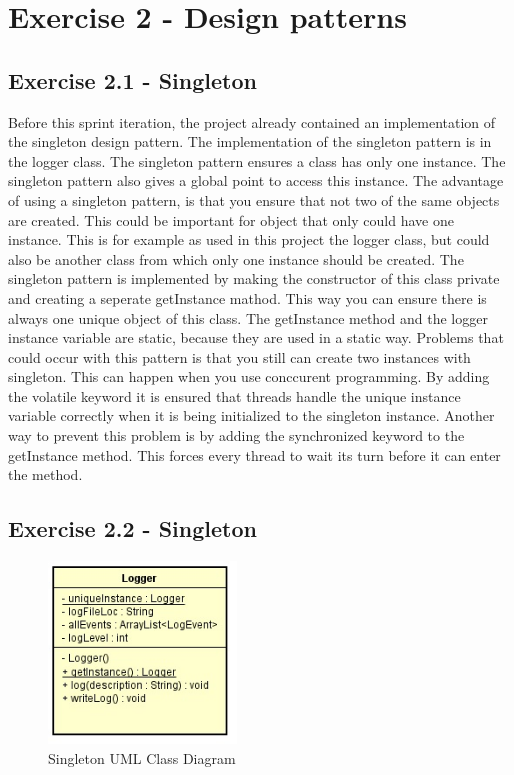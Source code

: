 \section{Exercise 2 - Design patterns }
\subsection{Exercise 2.1 - Singleton}
Before this sprint iteration, the project already contained an implementation of the singleton design pattern. The implementation of the singleton pattern is in the logger class. The singleton pattern ensures a class has only one instance. The singleton pattern also gives a global point to access this instance. The advantage of using a singleton pattern, is that you ensure that not two of the same objects are created. This could be important for object that only could have one instance. This is for example as used in this project the logger class, but could also be another class from which only one instance should be created.  The singleton pattern is implemented by making the constructor of this class private and creating a seperate getInstance mathod. This way you can ensure there is always one unique object of this class. The getInstance method and the logger instance variable are static, because they are used in a static way. Problems that could occur with this pattern is that you still can create two instances with singleton. This can happen when you use conccurent programming. By adding the volatile keyword it is ensured that threads handle the unique instance variable correctly when it is being initialized to the singleton instance.
Another way to prevent this problem is by adding the synchronized keyword to the getInstance method. This forces every thread to wait its turn before it can enter the method.
\subsection{Exercise 2.2 - Singleton}
\begin{figure}[ht!]
\centering
\includegraphics[width=5cm]{logger.jpg}
\caption{Singleton UML Class Diagram}
\label{fig:2-2singleton}
\end{figure}

